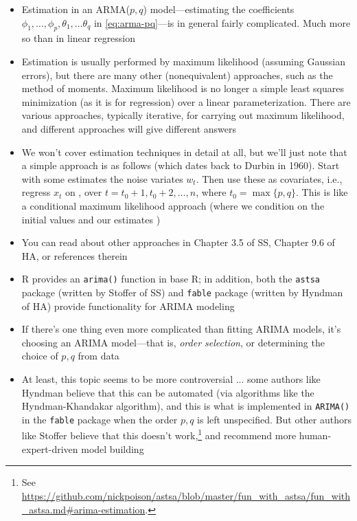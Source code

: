 \documentclass{article}
\begin{document}
\begin{itemize}
\item Estimation in an ARMA($p,q$) model---estimating the coefficients
  $\phi_1,\dots,\phi_p,\theta_1,\dots\theta_q$ in \eqref{eq:arma-pq}---is in 
  general fairly complicated. Much more so than in linear regression 

\item Estimation is usually performed by maximum likelihood (assuming Gaussian
  errors), but there are many other (nonequivalent) approaches, such as the
  method of moments. Maximum likelihood is no longer a simple least squares 
  minimization (as it is for regression) over a linear parameterization. There
  are various approaches, typically iterative, for carrying out maximum
  likelihood, and different approaches will give different answers     

\item We won't cover estimation techniques in detail at all, but we'll just note
  that a simple approach is as follows (which dates back to Durbin in
  1960). Start with some estimates  the noise variates
  $w_t$. Then use these as covariates, i.e., regress $x_t$ on
  , over $t =
  t_0+1,t_0+2,\dots,n$, where $t_0 = \max\{p,q\}$. This is like a conditional  
  maximum likelihood approach (where we condition on the initial values
   and our estimates
  )

\item You can read about other approaches in Chapter 3.5 of SS, Chapter 9.6 of
  HA, or references therein  

\item R provides an \verb|arima()| function in base R; in addition, both the
  \verb|astsa| package (written by Stoffer of SS) and \verb|fable| package
  (written by Hyndman of HA) provide functionality for ARIMA modeling

\item If there's one thing even more complicated than fitting ARIMA models, it's
  choosing an ARIMA model---that is, \emph{order selection}, or determining the 
  choice of $p,q$ from data 

\item At least, this topic seems to be more controversial ... some authors like
  Hyndman believe that this can be automated (via algorithms like the
  Hyndman-Khandakar algorithm), and this is what is implemented in
  \verb|ARIMA()| in the \verb|fable| package when the order $p,q$ is left 
  unspecified. But other authors like Stoffer believe that this doesn't
  work,\footnote{See
    \url{https://github.com/nickpoison/astsa/blob/master/fun_with_astsa/fun_with_astsa.md\#arima-estimation}.} 
  and recommend more human-expert-driven model building  


\end{itemize}
\end{document}
